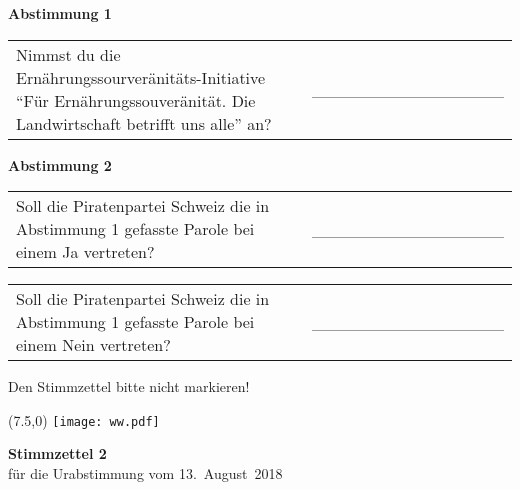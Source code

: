 \documentclass[11pt, a4paper]{scrartcl}
\begin{document}
{\begin{minipage}[t][12.5cm][t]{17.7cm}
\vspace{1cm}

\textbf{Abstimmung 1}

\vspace{0.5cm}

\begin{tabular}{ b{13.5cm} b{3cm} }
Nimmst du die Ernährungssourveränitäts-Initiative \enquote{Für Ernährungssouveränität. Die Landwirtschaft betrifft uns alle} an?
& \_\_\_\_\_\_\_\_\_\_\_\_\_\_\_\_ \\
\end{tabular}

\vspace{0.5cm}

\textbf{Abstimmung 2}

\vspace{0.5cm}

\begin{tabular}{ b{13.5cm} b{3cm} }
Soll die Piratenpartei Schweiz die in Abstimmung 1 gefasste Parole bei einem Ja vertreten?
& \_\_\_\_\_\_\_\_\_\_\_\_\_\_\_\_ \\
\end{tabular}

\vspace{0.5cm}

\begin{tabular}{ b{13.5cm} b{3cm} }
Soll die Piratenpartei Schweiz die in Abstimmung 1 gefasste Parole bei einem Nein vertreten? 
& \_\_\_\_\_\_\_\_\_\_\_\_\_\_\_\_ \\
\end{tabular}

\vspace{0.5cm}

Den Stimmzettel bitte nicht markieren!

\end{minipage}

\newpage

\begin{minipage}[t][12.5cm][t]{17.7cm}

\begin{textblock}{6}(7.5,0)
\texttt{[image: ww.pdf]}
\end{textblock}

{\LARGE\textbf{Stimmzettel 2}} \\
für die Urabstimmung vom 13.~August~2018 \\

\vspace{2cm}


\end{minipage}}
\end{document}
